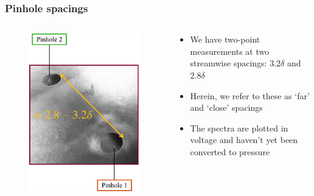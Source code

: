 \documentclass[aspectratio=169,9pt]{beamer}
\begin{document}
\begin{frame}
  \frametitle{Pinhole spacings}

  \begin{columns}
    \begin{column}{0.3\textwidth}
      \begin{figure}
        \centering
        \includegraphics[width=\textwidth]{pinhole_spacing.pdf}
      \end{figure}
    \end{column}
    \begin{column}{0.5\textwidth}
      \begin{itemize}
        \item We have two-point measurements at two streamwise spacings: $3.2\delta$ and $2.8\delta$
        \item Herein, we refer to these as `far' and `close' spacings
        \item The spectra are plotted in voltage and haven't yet been converted to pressure
      \end{itemize}
    \end{column}
  \end{columns}
\end{frame}
\end{document}
